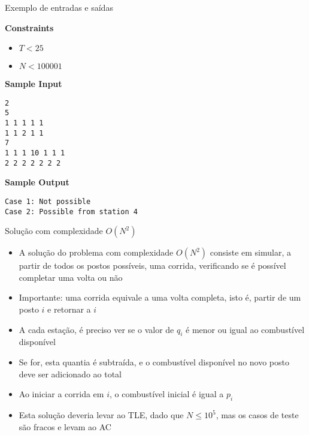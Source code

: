 \begin{frame}[fragile]{Exemplo de entradas e saídas}

\textbf{Constraints}

\begin{itemize}
    \item $T < 25$
    \item $N < 100001$
\end{itemize}

\vspace{0.2in}

\begin{minipage}[t]{0.5\textwidth}
\textbf{Sample Input}
\begin{verbatim}
2
5
1 1 1 1 1
1 1 2 1 1
7
1 1 1 10 1 1 1
2 2 2 2 2 2 2
\end{verbatim}
\end{minipage}
\begin{minipage}[t]{0.45\textwidth}
\textbf{Sample Output}
\begin{verbatim}
Case 1: Not possible
Case 2: Possible from station 4
\end{verbatim}
\end{minipage}
\end{frame}

\begin{frame}[fragile]{Solução com complexidade $O(N^2)$}

    \begin{itemize}
        \item A solução do problema com complexidade $O(N^2)$ consiste em simular, a partir 
            de todos os postos possíveis, uma corrida, verificando se é possível 
            completar uma volta ou não

        \item Importante: uma corrida equivale a uma volta completa, isto é,
            partir de um posto $i$ e retornar a $i$

        \item A cada estação, é preciso ver se o valor de $q_i$ é menor ou igual ao combustível
            disponível

        \item Se for, esta quantia é subtraída, e o combustível disponível no novo posto deve
            ser adicionado ao total

        \item Ao iniciar a corrida em $i$, o combustível inicial é igual a $p_i$

        \item Esta solução deveria levar ao TLE, dado que $N \leq 10^5$, mas os casos de
            teste são fracos e levam ao AC
   \end{itemize}

\end{frame}


